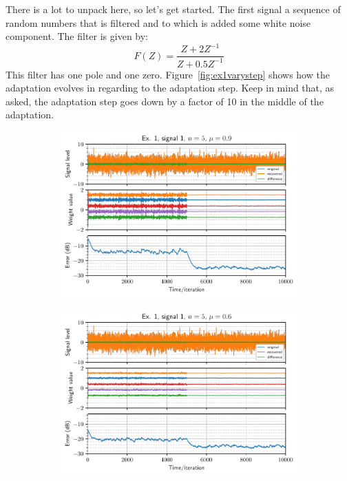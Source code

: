 There is a lot to unpack here, so let's get started. The first signal a sequence
of random numbers that is filtered and to which is added some white noise
component. The filter is given by:
\begin{equation}
    F(Z) = \frac{Z+2Z^{-1}}{Z+0.5Z^{-1}}
\end{equation}
This filter has one pole and one zero. Figure~\ref{fig:ex1varystep} shows how the
adaptation evolves in regarding to the adaptation step. Keep in mind that, as
asked, the adaptation step goes down by a factor of 10 in the middle of the
adaptation.
\begin{figure}[h]
    \centering
    \begin{subfigure}[t]{0.30\columnwidth}
        \centering
        \includegraphics[width=\columnwidth]{figures/pdf/ex1_l1_n5_mu90.pdf}
        \caption{}
    \end{subfigure} \hfill
    \begin{subfigure}[t]{0.30\columnwidth}
        \centering
        \includegraphics[width=\columnwidth]{figures/pdf/ex1_l1_n5_mu60.pdf}

\end{subfigure}
\end{figure}
